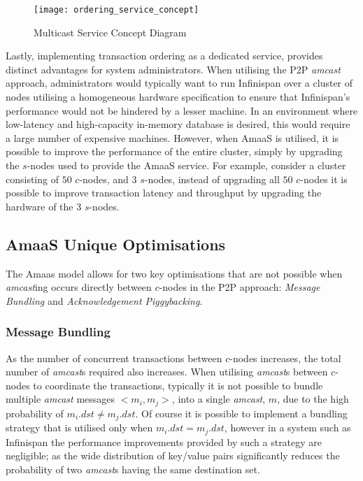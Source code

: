     \begin{figure}[htbp!] 
        \centering    
         \texttt{[image: ordering\_service\_concept]}
         \caption[Multicast Service Concept Diagram]{Multicast Service Concept Diagram}
         \label{fig:ordering_service_concept}
    \end{figure}	 

	Lastly, implementing transaction ordering as a dedicated service, provides distinct advantages for system administrators.  When utilising the P2P \emph{amcast} approach, administrators would typically want to run Infinispan over a cluster of nodes utilising a homogeneous hardware specification to ensure that Infinispan's performance would not be hindered by a lesser machine.  In an environment where low-latency and high-capacity in-memory database is desired, this would require a large number of expensive machines. However, when \textsf{AmaaS} is utilised, it is possible to improve the performance of the entire cluster, simply by upgrading the $s$-nodes used to provide the \textsf{AmaaS} service.  For example, consider a cluster consisting of $50$ $c$-nodes, and $3$ $s$-nodes, instead of upgrading all $50$ $c$-nodes it is possible to improve transaction latency and throughput by upgrading the hardware of the $3$ $s$-nodes.  
	
	\subsection*{AmaaS Unique Optimisations}\label{ssec:abaas_optimisations}
	The \textsf{Amaas} model allows for two key optimisations that are not possible when \emph{amcast}ing occurs directly between $c$-nodes in the P2P approach: \emph{Message Bundling} and \emph{Acknowledgement Piggybacking}.  
	
		\subsubsection*{Message Bundling}
		As the number of concurrent transactions between $c$-nodes increases, the total number of \emph{amcast}s required also increases.  When utilising \emph{amcast}s between $c$-nodes to coordinate the transactions, typically it is not possible to bundle multiple \emph{amcast} messages $<m_i, m_j>$, into a single \emph{amcast}, $m$, due to the high probability of $m_i.dst \neq m_j.dst$.  Of course it is possible to implement a bundling strategy that is utilised only when $m_i.dst = m_j.dst$, however in a system such as Infinispan the performance improvements provided by such a strategy are negligible; as the wide distribution of key/value pairs significantly reduces the probability of two \emph{amcast}s having the same destination set.  
		
